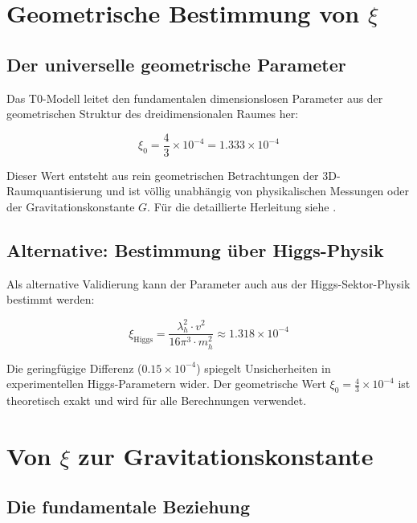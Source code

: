 \documentclass[12pt,a4paper]{article}
\begin{document}
	\section{Geometrische Bestimmung von $\xi$}
	
	\subsection{Der universelle geometrische Parameter}
	
	Das T0-Modell leitet den fundamentalen dimensionslosen Parameter aus der geometrischen Struktur des dreidimensionalen Raumes her:
	
	\begin{equation}
		\xi_0 = \frac{4}{3} \times 10^{-4} = 1.333 \times 10^{-4}
	\end{equation}
	
	\begin{tcolorbox}[colback=green!5!white,colframe=green!75!black,title=Geometrische Grundlage]
		Dieser Wert entsteht aus rein geometrischen Betrachtungen der 3D-Raumquantisierung und ist völlig unabhängig von physikalischen Messungen oder der Gravitationskonstante $G$. Für die detaillierte Herleitung siehe \cite{pascher_geometry_2024_DE}.
	\end{tcolorbox}
	
	\subsection{Alternative: Bestimmung über Higgs-Physik}
	
	Als alternative Validierung kann der Parameter auch aus der Higgs-Sektor-Physik bestimmt werden:
	
	\begin{equation}
		\xi_{\text{Higgs}} = \frac{\lambda_h^2 \cdot v^2}{16\pi^3 \cdot m_h^2} \approx 1.318 \times 10^{-4}
	\end{equation}
	
	Die geringfügige Differenz ($0.15 \times 10^{-4}$) spiegelt Unsicherheiten in experimentellen Higgs-Parametern wider. Der geometrische Wert $\xi_0 = \frac{4}{3} \times 10^{-4}$ ist theoretisch exakt und wird für alle Berechnungen verwendet.
	
	\section{Von $\xi$ zur Gravitationskonstante}
	
	\subsection{Die fundamentale Beziehung}
	
\end{document}
